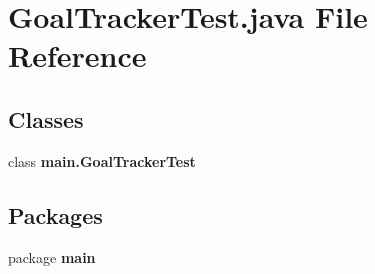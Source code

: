 \section{Goal\+Tracker\+Test.\+java File Reference}
\label{_goal_tracker_test_8java}
\subsection*{Classes}
\begin{DoxyCompactItemize}
\item 
class \textbf{ main.\+Goal\+Tracker\+Test}
\end{DoxyCompactItemize}
\subsection*{Packages}
\begin{DoxyCompactItemize}
\item 
package \textbf{ main}
\end{DoxyCompactItemize}
